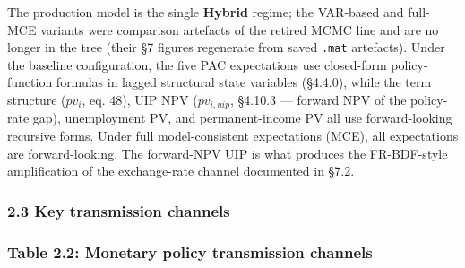\documentclass[
]{article}
\begin{document}
The production model is the single \textbf{Hybrid} regime; the VAR-based
and full-MCE variants were comparison artefacts of the retired MCMC line
and are no longer in the tree (their §7 figures regenerate from saved
\texttt{.mat} artefacts). Under the baseline configuration, the five PAC
expectations use closed-form policy-function formulas in lagged
structural state variables (§4.4.0), while the term structure (\(pv_i\),
eq. 48), UIP NPV (\(pv_{i,uip}\), §4.10.3 --- forward NPV of the
policy-rate gap), unemployment PV, and permanent-income PV all use
forward-looking recursive forms. Under full model-consistent
expectations (MCE), all expectations are forward-looking. The
forward-NPV UIP is what produces the FR-BDF-style amplification of the
exchange-rate channel documented in §7.2.

\subsubsection{2.3 Key transmission
channels}\label{key-transmission-channels}

\subsubsection{Table 2.2: Monetary policy transmission
channels}\label{table-2.2-monetary-policy-transmission-channels}
\end{document}
